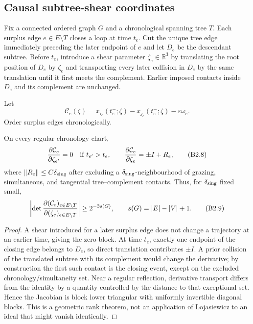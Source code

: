 \subsection{Causal subtree-shear coordinates}

Fix a connected ordered graph $G$ and a chronological spanning tree $T$.
Each surplus edge $e\in E\setminus T$ closes a loop at time $t_e$.  Cut the
unique tree edge immediately preceding the later endpoint of $e$ and let
$D_e$ be the descendant subtree.  Before $t_e$, introduce a shear parameter
$\zeta_e\in\mathbb R^3$ by translating the root position of $D_e$ by
$\zeta_e$ and transporting every later collision in $D_e$ by the same
translation until it first meets the complement.  Earlier imposed contacts
inside $D_e$ and its complement are unchanged.

Let
\[
 \mathcal C_e(\zeta)
 =x_{i_e}(t_e^-;\zeta)-x_{j_e}(t_e^-;\zeta)-\varepsilon\omega_e.         \tag{B2.7}
\]
Order surplus edges chronologically.

\begin{lemma}
\label{lem:r27-b2-triangular}
On every regular chronology chart,
\[
 {\partial\mathcal C_e\over\partial\zeta_{e'}}
 =0\quad\text{if }t_{e'}>t_e,\qquad
 {\partial\mathcal C_e\over\partial\zeta_e}
 =\pm I+R_e,                                             \tag{B2.8}
\]
where $\|R_e\|\le C\delta_{\rm sing}$ after excluding a
$\delta_{\rm sing}$-neighbourhood of grazing, simultaneous, and tangential
tree--complement contacts.  Thus, for $\delta_{\rm sing}$ fixed small,
\[
 \left|\det{\partial(\mathcal C_e)_{e\in E\setminus T}
                \over\partial(\zeta_e)_{e\in E\setminus T}}\right|
 \ge2^{-3s(G)},\qquad s(G)=|E|-|V|+1.                    \tag{B2.9}
\]
\end{lemma}

\begin{proof}
A shear introduced for a later surplus edge does not change a trajectory at
an earlier time, giving the zero block.  At time $t_e$, exactly one endpoint
of the closing edge belongs to $D_e$, so direct translation contributes
$\pm I$.  A prior collision of the translated subtree with its complement
would change the derivative; by construction the first such contact is the
closing event, except on the excluded chronology/simultaneity set.  Near a
regular reflection, derivative transport differs from the identity by a
quantity controlled by the distance to that exceptional set.  Hence the
Jacobian is block lower triangular with uniformly invertible diagonal blocks.
This is a geometric rank theorem, not an application of Lojasiewicz to an
ideal that might vanish identically.
\end{proof}

